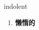 
\begin{frame}
{\huge indolent}
\begin{center}
\begin{enumerate}\Large
  \item \textbf{懒惰的}
\end{enumerate}
\end{center}
\end{frame}
